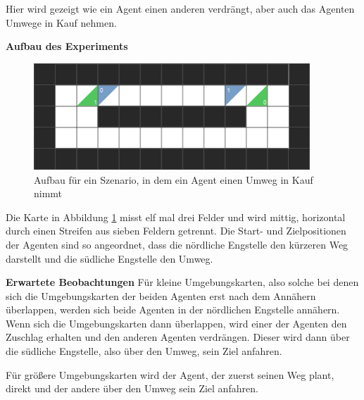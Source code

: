 Hier wird gezeigt wie ein Agent einen anderen verdrängt, aber auch das Agenten Umwege in Kauf nehmen.

\textbf{Aufbau des Experiments}
\begin{figure}[H]
    \includegraphics[height=40mm]{images/detour.png}
    \centering
    \caption{Aufbau für ein Szenario, in dem ein Agent einen Umweg in Kauf nimmt}
    \label{fig:umweg}
\end{figure}
Die Karte in Abbildung \ref{fig:umweg} misst elf mal drei Felder und wird mittig, horizontal durch einen Streifen aus sieben Feldern getrennt. Die Start- und Zielpositionen der Agenten sind so angeordnet, dass die nördliche Engstelle den kürzeren Weg darstellt und die südliche Engstelle den Umweg.

\textbf{Erwartete Beobachtungen}\newline
Für kleine Umgebungskarten, also solche bei denen sich die Umgebungskarten der beiden Agenten erst nach dem Annähern überlappen, werden sich beide Agenten in der nördlichen Engstelle annähern. Wenn sich die Umgebungskarten dann überlappen, wird einer der Agenten den Zuschlag erhalten und den anderen Agenten verdrängen. Dieser wird dann über die südliche Engstelle, also über den Umweg, sein Ziel anfahren.

Für größere Umgebungskarten wird der Agent, der zuerst seinen Weg plant, direkt und der andere über den Umweg sein Ziel anfahren.
